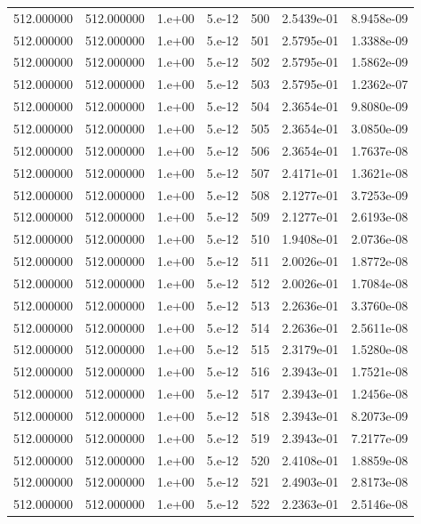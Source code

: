 \begin{table}[htbp]
\begin{tabular}{rrrrrrr}
512.000000 & 512.000000 & 1.e+00 & 5.e-12 & 500 & 2.5439e-01 & 8.9458e-09 \\
512.000000 & 512.000000 & 1.e+00 & 5.e-12 & 501 & 2.5795e-01 & 1.3388e-09 \\
512.000000 & 512.000000 & 1.e+00 & 5.e-12 & 502 & 2.5795e-01 & 1.5862e-09 \\
512.000000 & 512.000000 & 1.e+00 & 5.e-12 & 503 & 2.5795e-01 & 1.2362e-07 \\
512.000000 & 512.000000 & 1.e+00 & 5.e-12 & 504 & 2.3654e-01 & 9.8080e-09 \\
512.000000 & 512.000000 & 1.e+00 & 5.e-12 & 505 & 2.3654e-01 & 3.0850e-09 \\
512.000000 & 512.000000 & 1.e+00 & 5.e-12 & 506 & 2.3654e-01 & 1.7637e-08 \\
512.000000 & 512.000000 & 1.e+00 & 5.e-12 & 507 & 2.4171e-01 & 1.3621e-08 \\
512.000000 & 512.000000 & 1.e+00 & 5.e-12 & 508 & 2.1277e-01 & 3.7253e-09 \\
512.000000 & 512.000000 & 1.e+00 & 5.e-12 & 509 & 2.1277e-01 & 2.6193e-08 \\
512.000000 & 512.000000 & 1.e+00 & 5.e-12 & 510 & 1.9408e-01 & 2.0736e-08 \\
512.000000 & 512.000000 & 1.e+00 & 5.e-12 & 511 & 2.0026e-01 & 1.8772e-08 \\
512.000000 & 512.000000 & 1.e+00 & 5.e-12 & 512 & 2.0026e-01 & 1.7084e-08 \\
512.000000 & 512.000000 & 1.e+00 & 5.e-12 & 513 & 2.2636e-01 & 3.3760e-08 \\
512.000000 & 512.000000 & 1.e+00 & 5.e-12 & 514 & 2.2636e-01 & 2.5611e-08 \\
512.000000 & 512.000000 & 1.e+00 & 5.e-12 & 515 & 2.3179e-01 & 1.5280e-08 \\
512.000000 & 512.000000 & 1.e+00 & 5.e-12 & 516 & 2.3943e-01 & 1.7521e-08 \\
512.000000 & 512.000000 & 1.e+00 & 5.e-12 & 517 & 2.3943e-01 & 1.2456e-08 \\
512.000000 & 512.000000 & 1.e+00 & 5.e-12 & 518 & 2.3943e-01 & 8.2073e-09 \\
512.000000 & 512.000000 & 1.e+00 & 5.e-12 & 519 & 2.3943e-01 & 7.2177e-09 \\
512.000000 & 512.000000 & 1.e+00 & 5.e-12 & 520 & 2.4108e-01 & 1.8859e-08 \\
512.000000 & 512.000000 & 1.e+00 & 5.e-12 & 521 & 2.4903e-01 & 2.8173e-08 \\
512.000000 & 512.000000 & 1.e+00 & 5.e-12 & 522 & 2.2363e-01 & 2.5146e-08 \\

\end{tabular}
\end{table}
